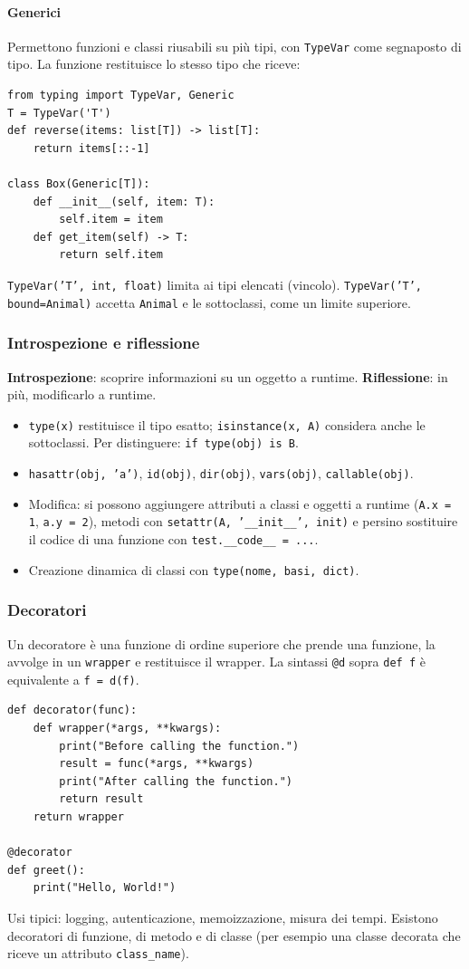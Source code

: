 \documentclass[a4paper,12pt]{article}
\begin{document}
\paragraph{Generici} Permettono funzioni e classi riusabili su più tipi, con
\texttt{TypeVar} come segnaposto di tipo. La funzione restituisce lo stesso tipo che riceve:
\begin{verbatim}
from typing import TypeVar, Generic
T = TypeVar('T')
def reverse(items: list[T]) -> list[T]:
    return items[::-1]

class Box(Generic[T]):
    def __init__(self, item: T):
        self.item = item
    def get_item(self) -> T:
        return self.item
\end{verbatim}
\texttt{TypeVar('T', int, float)} limita ai tipi elencati (vincolo). \texttt{TypeVar('T',
bound=Animal)} accetta \texttt{Animal} e le sottoclassi, come un limite superiore.

\subsubsection{Introspezione e riflessione}
\textbf{Introspezione}: scoprire informazioni su un oggetto a runtime. \textbf{Riflessione}:
in più, modificarlo a runtime.
\begin{itemize}[nosep]
  \item \texttt{type(x)} restituisce il tipo esatto; \texttt{isinstance(x, A)} considera anche
        le sottoclassi. Per distinguere: \texttt{if type(obj) is B}.
  \item \texttt{hasattr(obj, 'a')}, \texttt{id(obj)}, \texttt{dir(obj)}, \texttt{vars(obj)},
        \texttt{callable(obj)}.
  \item Modifica: si possono aggiungere attributi a classi e oggetti a runtime
        (\texttt{A.x = 1}, \texttt{a.y = 2}), metodi con \texttt{setattr(A, '\_\_init\_\_', init)}
        e persino sostituire il codice di una funzione con \texttt{test.\_\_code\_\_ = ...}.
  \item Creazione dinamica di classi con \texttt{type(nome, basi, dict)}.
\end{itemize}

\subsubsection{Decoratori}
Un decoratore è una funzione di ordine superiore che prende una funzione, la avvolge in un
\texttt{wrapper} e restituisce il wrapper. La sintassi \texttt{@d} sopra \texttt{def f} è
equivalente a \texttt{f = d(f)}.
\begin{verbatim}
def decorator(func):
    def wrapper(*args, **kwargs):
        print("Before calling the function.")
        result = func(*args, **kwargs)
        print("After calling the function.")
        return result
    return wrapper

@decorator
def greet():
    print("Hello, World!")
\end{verbatim}
Usi tipici: logging, autenticazione, memoizzazione, misura dei tempi. Esistono decoratori di
funzione, di metodo e di classe (per esempio una classe decorata che riceve un attributo
\texttt{class\_name}).
\end{document}
